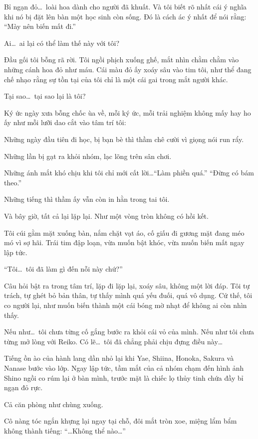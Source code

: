 \documentclass[../main.tex]{subfiles}
\begin{document}
Bỉ ngạn đỏ\dots\ loài hoa dành cho người đã khuất. Và tôi biết rõ nhất cái ý nghĩa khi nó bị đặt lên bàn một học sinh còn sống. Đó là cách ác ý nhất để nói rằng: ``Mày nên biến mất đi.''

Ai\dots\ ai lại có thể làm thế này với tôi?

Đầu gối tôi bỗng rã rời. Tôi ngồi phịch xuống ghế, mắt nhìn chằm chằm vào những cánh hoa đỏ như máu. Cái màu đỏ ấy xoáy sâu vào tim tôi, như thể đang chế nhạo rằng sự tồn tại của tôi chỉ là một cái gai trong mắt người khác.

Tại sao\dots\ tại sao lại là tôi?

Ký ức ngày xưa bỗng chốc ùa về, mỗi ký ức, mỗi trải nghiệm không mấy hay ho ấy như mỗi lưỡi dao cắt vào tâm trí tôi:

Những ngày đầu tiên đi học, bị bạn bè thì thầm chê cười vì giọng nói run rẩy.

Những lần bị gạt ra khỏi nhóm, lạc lõng trên sân chơi.

Những ánh mắt khó chịu khi tôi chỉ mới cất lời\dots ``Làm phiền quá.'' ``Đừng có bám theo.''

Những tiếng thì thầm ấy vẫn còn in hằn trong tai tôi.

Và bây giờ, tất cả lại lặp lại. Như một vòng tròn không có hồi kết.

Tôi cúi gằm mặt xuống bàn, nắm chặt vạt áo, cố giấu đi gương mặt đang méo mó vì sợ hãi. Trái tim đập loạn, vừa muốn bật khóc, vừa muốn biến mất ngay lập tức.

``Tôi\dots\ tôi đã làm gì đến nỗi này chứ?''

Câu hỏi bật ra trong tâm trí, lặp đi lặp lại, xoáy sâu, không một lời đáp. Tôi tự trách, tự ghét bỏ bản thân, tự thấy mình quá yếu đuối, quá vô dụng. Cứ thế, tôi co người lại, như muốn biến thành một cái bóng mờ nhạt để không ai còn nhìn thấy.

Nếu như\dots\ tôi chưa từng cố gắng bước ra khỏi cái vỏ của mình. Nếu như tôi chưa từng mở lòng với Reiko. Có lẽ\dots\ tôi đã chẳng phải chịu đựng điều này\dots

\pov{-}

Tiếng ồn ào của hành lang dần nhỏ lại khi Yae, Shiina, Honoka, Sakura và Nanase bước vào lớp. Ngay lập tức, tầm mắt của cả nhóm chạm đến hình ảnh Shino ngồi co rúm lại ở bàn mình, trước mặt là chiếc lọ thủy tinh chứa đầy bỉ ngạn đỏ rực.

Cả căn phòng như chùng xuống.

Cô nàng tóc ngắn khựng lại ngay tại chỗ, đôi mắt tròn xoe, miệng lẩm bẩm không thành tiếng: ``\dots Không thể nào\dots''
\end{document}
